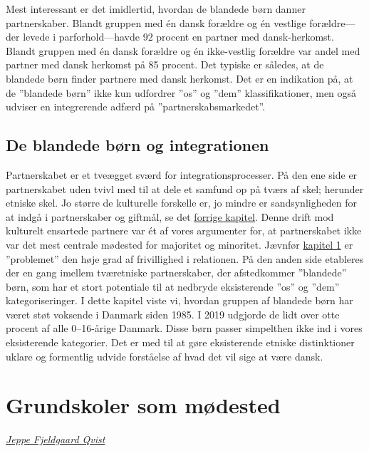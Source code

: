 \documentclass[
]{book}
\begin{document}
Mest interessant er det imidlertid, hvordan de blandede børn danner partnerskaber. Blandt gruppen med én dansk forældre og én vestlige forældre---der levede i parforhold---havde 92 procent en partner med dansk-herkomst. Blandt gruppen med én dansk forældre og én ikke-vestlig forældre var andel med partner med dansk herkomst på 85 procent. Det typiske er således, at de blandede børn finder partnere med dansk herkomst. Det er en indikation på, at de ''blandede børn'' ikke kun udfordrer ''os'' og ''dem'' klassifikationer, men også udviser en integrerende adfærd på ''partnerskabsmarkedet''.

\section{De blandede børn og integrationen}\label{de-blandede-buxf8rn-og-integrationen}

Partnerskabet er et tveægget sværd for integrationsprocesser. På den ene side er partnerskabet uden tvivl med til at dele et samfund op på tværs af skel; herunder etniske skel. Jo større de kulturelle forskelle er, jo mindre er sandsynligheden for at indgå i partnerskaber og giftmål, se det \hyperref[kap1]{forrige kapitel}. Denne drift mod kulturelt ensartede partnere var ét af vores argumenter for, at partnerskabet ikke var det mest centrale mødested for majoritet og minoritet. Jævnfør \hyperref[kap1]{kapitel 1} er ''problemet'' den høje grad af frivillighed i relationen. På den anden side etableres der en gang imellem tværetniske partnerskaber, der afstedkommer ''blandede'' børn, som har et stort potentiale til at nedbryde eksisterende ''os'' og ''dem'' kategoriseringer. I dette kapitel viste vi, hvordan gruppen af blandede børn har været støt voksende i Danmark siden 1985. I 2019 udgjorde de lidt over otte procent af alle 0--16-årige Danmark. Disse børn passer simpelthen ikke ind i vores eksisterende kategorier. Det er med til at gøre eksisterende etniske distinktioner uklare og formentlig udvide forståelse af hvad det vil sige at være dansk.

\newpage
\thispagestyle{empty}

\chapter{Grundskoler som mødested}\label{kap4}

\thispagestyle{empty}

\emph{\href{https://vbn.aau.dk/da/persons/jeppefl}{Jeppe Fjeldgaard Qvist}}
\end{document}
